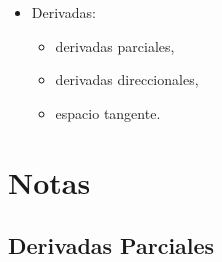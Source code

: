 \documentclass[11pt]{book}
\theoremstyle{definicion}
\theoremstyle{teorema}
\theoremstyle{ejemplo}
\newtheorem{definition}{Definición}
\begin{document}
\begin{itemize}
    \item Derivadas: 
        \begin{itemize}
            \item derivadas parciales,
            \item derivadas direccionales,
            \item espacio tangente.
        \end{itemize}
\end{itemize}

\section{Notas}






\subsection{Derivadas Parciales}

\end{document}
